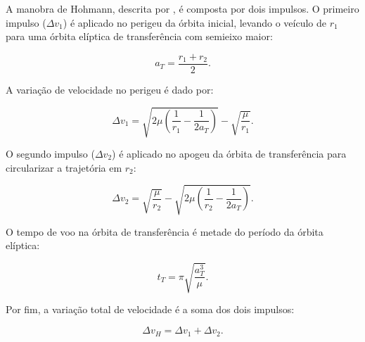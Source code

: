 A manobra de Hohmann, descrita por \cite{weberHohmann}, é composta por dois impulsos.
O primeiro impulso ($\Delta v_1$) é aplicado no perigeu da órbita inicial, levando o veículo de $r_1$ para uma órbita elíptica de transferência com semieixo maior:

\begin{equation}
a_T = \frac{r_1+r_2}{2}.
\end{equation}

A variação de velocidade no perigeu é dado por:

\begin{equation}
\Delta v_1 = \sqrt{2\mu \left(\frac{1}{r_1} - \frac{1}{2a_T}\right)} - \sqrt{\frac{\mu}{r_1}}.
\end{equation}

O segundo impulso ($\Delta v_2$) é aplicado no apogeu da órbita de transferência para circularizar a trajetória em $r_2$:

\begin{equation}
\Delta v_2 = \sqrt{\frac{\mu}{r_2}} - \sqrt{2\mu \left(\frac{1}{r_2} - \frac{1}{2a_T}\right)}.
\end{equation}

O tempo de voo na órbita de transferência é metade do período da órbita elíptica:

\begin{equation}
t_T = \pi \sqrt{\frac{a_T^3}{\mu}}.
\end{equation}

Por fim, a variação total de velocidade é a soma dos dois impulsos:

\begin{equation}
\Delta v_{H} = \Delta v_1 + \Delta v_2.
\end{equation}



